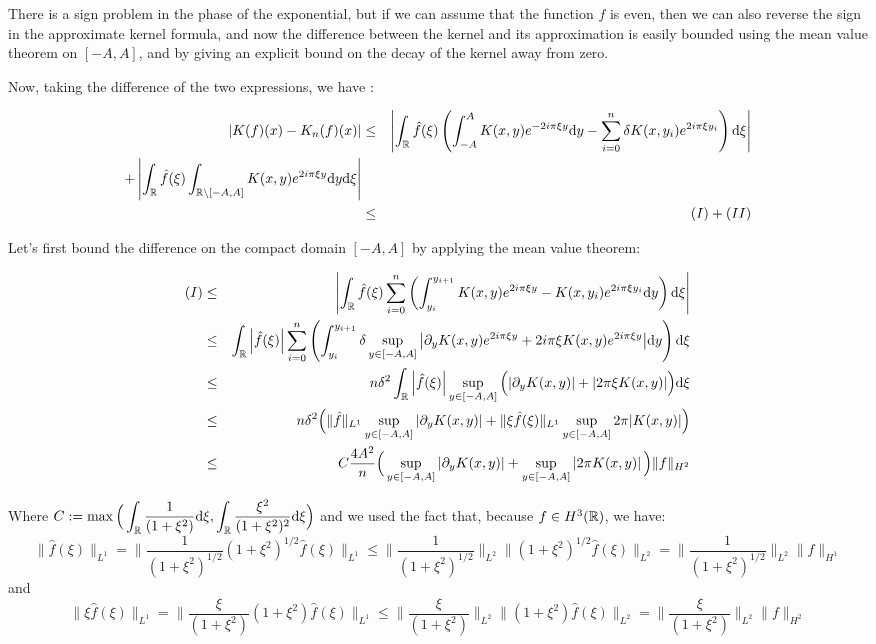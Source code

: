 \documentclass[11pt,a4paper]{article}
\begin{document}
There is a sign problem in the phase of the exponential, but if we can assume that the function $f$ is even, then we can also reverse the sign in the approximate kernel formula, and now the difference between the kernel and its approximation is easily bounded using the mean value theorem on $[-A,A]$, and by giving an explicit bound on the decay of the kernel away from zero. 

Now, taking the difference of the two expressions, we have :

\begin{eqnarray*}
\left| K(f)(x) - K_n(f)(x)\right| &\leq& \left|  \int_\mathbb R \hat{f}(\xi) \left(\int_{-A}^A K(x,y)e^{-2i\pi\xi y}\mathrm{d}y - \sum_{i=0}^n \delta K(x,y_i) e^{2i\pi\xi y_i} \right)\mathrm{d}\xi \right| \\ + \left|\int_\mathbb R \hat{f}(\xi) \int_{\mathbb R \setminus [-A,A]} K(x,y)e^{2i\pi\xi y}\mathrm{d}y\mathrm{d}\xi \right| \\
&\leq& (I) + (II)
\end{eqnarray*}

Let's first bound the difference on the compact domain $[-A,A]$ by applying the mean value theorem:

\begin{eqnarray*}
(I) &\leq&  \left|  \int_\mathbb R \hat{f}(\xi)  \sum_{i=0}^n \left(\int_{y_i}^{y_{i+1}} K(x,y)e^{2i\pi\xi y} - K(x,y_i) e^{2i\pi\xi y_i}\mathrm{d}y \right)\mathrm{d}\xi \right| \\
&\leq&   \int_\mathbb R \left| \hat{f}(\xi) \right|  \sum_{i=0}^n \left(\int_{y_i}^{y_{i+1}}  \delta \sup_{y\in[-A,A]} {\left|\partial_yK(x,y)e^{2i\pi\xi y} +2i\pi\xi K(x,y)e^{2i\pi\xi y} \right|} \mathrm{d}y \right)\mathrm{d}\xi \\
&\leq&  n  \delta^2  \int_\mathbb R \left| \hat{f}(\xi) \right|  \sup_{y\in[-A,A]}\Big( {\left|\partial_yK(x,y)\right|+ \left|2\pi\xi K(x,y)\right|}\Big) \mathrm{d}\xi \\
&\leq&  n  \delta^2 \Big(\| \hat{f}\|_{L^1}  \sup_{y\in[-A,A]}{\left|\partial_yK(x,y)\right|} +  \| \xi\hat{f}(\xi)\|_{L^1} \sup_{y\in[-A,A]}{2\pi|K(x,y)|} \Big) \\
&\leq&  C\frac{4A^2}{n}  \Big(\sup_{y\in[-A,A]}\left|\partial_yK(x,y)\right| + \sup_{y\in[-A,A]}\left|2\pi K(x,y)\right| \Big) \| f\|_{H^2} \\
\end{eqnarray*}

Where $C := \max\Big(\displaystyle \int_\mathbb R \frac{1}{(1+\xi^2)} \mathrm{d}\xi,\int_\mathbb R \frac{\xi^2}{(1+\xi^2)^2} \mathrm{d}\xi\Big)$ and we used the fact that, because $f\in H^3(\mathbb R)$, we have: \[\| \hat{f}(\xi)\|_{L^1} = \| \frac{1}{(1+\xi^2)^{1/2}}(1+\xi^2)^{1/2}\hat{f}(\xi)\|_{L^1} \leq \| \frac{1}{(1+\xi^2)^{1/2}}\|_{L^2} \|(1+\xi^2)^{1/2}\hat{f}(\xi)\|_{L^2} = \| \frac{1}{(1+\xi^2)^{1/2}}\|_{L^2} \| f\|_{H^1}  \] 
and  \[\| \xi\hat{f}(\xi)\|_{L^1} = \| \frac{\xi}{(1+\xi^2)}(1+\xi^2)\hat{f}(\xi)\|_{L^1} \leq \| \frac{\xi}{(1+\xi^2)}\|_{L^2} \|(1+\xi^2)\hat{f}(\xi)\|_{L^2} = \| \frac{\xi}{(1+\xi^2)}\|_{L^2} \| f\|_{H^2}  \] 
\end{document}
